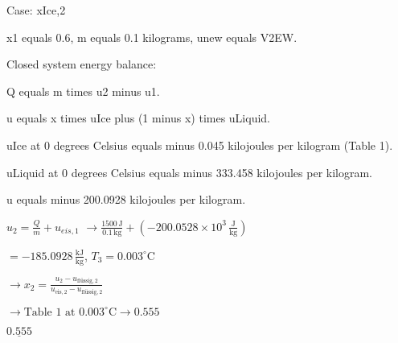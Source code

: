 Case: xIce,2  

x1 equals 0.6, m equals 0.1 kilograms, unew equals V2EW.  

Closed system energy balance:  

Q equals m times u2 minus u1.  

u equals x times uIce plus (1 minus x) times uLiquid.  

uIce at 0 degrees Celsius equals minus 0.045 kilojoules per kilogram (Table 1).  

uLiquid at 0 degrees Celsius equals minus 333.458 kilojoules per kilogram.  

u equals minus 200.0928 kilojoules per kilogram.

\( u_2 = \frac{Q}{m} + u_{eis,1} \)  
\( \rightarrow \frac{1500 \, \text{J}}{0.1 \, \text{kg}} + (-200.0528 \times 10^3 \, \frac{\text{J}}{\text{kg}}) \)  

\( = -185.0928 \, \frac{\text{kJ}}{\text{kg}} \), \( T_3 = 0.003^\circ \text{C} \)  

\( \rightarrow x_2 = \frac{u_2 - u_{\text{flüssig},2}}{u_{\text{eis},2} - u_{\text{flüssig},2}} \)  

\( \rightarrow \text{Table 1 at } 0.003^\circ \text{C} \rightarrow 0.555 \)  

\( \underline{0.555} \)
